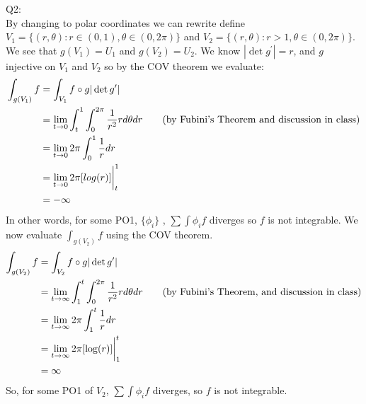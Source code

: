 \documentclass[letterpaper]{article}
\begin{document}
\noindent Q2: \\ 
By changing to polar coordinates we can rewrite define $V_1 = \{ (r,\theta): r\in (0,1), \theta \in (0,2\pi)\}$ and  \newline $V_2 = \{ (r,\theta): r>1, \theta \in (0,2\pi)\}$. We see that $g(V_1)=U_1$ and $g(V_2) = U_2$. 
We know $|\det g^\prime| = r$, and $g$ injective on $V_1$ and $V_2$ so by the COV theorem we evaluate:
\begin{align*}
    \int_{g(V_1)} f & = \int_{V_1} f\circ g |\det g^\prime|
    \\ & =  \lim_{t\rightarrow 0}\int_t^1 \int_{0}^{2\pi} \frac{1}{r^2} r \space d\theta dr \tag{by Fubini's Theorem and discussion in class}
    \\ & =  \lim_{t \rightarrow 0} 2\pi \int_{0}^{1} \frac{1}{r} dr 
    \\ & = \lim_{t\rightarrow 0} 2\pi [log(r)]\bigg|_t^1
    \\ & = - \infty 
\end{align*}  In other words, for some PO1, $\{\phi_i\}$ , $\sum \int \phi_i f$ diverges so $f$ is not integrable. 
We now evaluate $\int_{g(V_2)} f$ using the COV theorem. 
\begin{align*}
    \int_{g(V_2)} f &= \int_{V_2} f\circ g |\det g^\prime|
    \\ & = \lim_{t \rightarrow \infty} \int_1^t \int_0^{2\pi} \frac{1}{r^2}r \space d\theta dr \tag{by Fubini's Theorem, and discussion in class}
    \\ & =  \lim_{t \rightarrow \infty}2\pi \int_1^t \frac{1}{r} \space dr 
    \\ & = \lim_{t\rightarrow \infty}2\pi [\log(r)]\bigg|_1^t 
    \\ & = \infty
\end{align*}
So, for some PO1 of $V_2$, $\sum \int \phi_i f$ diverges, so $f$ is not integrable.
\end{document}
